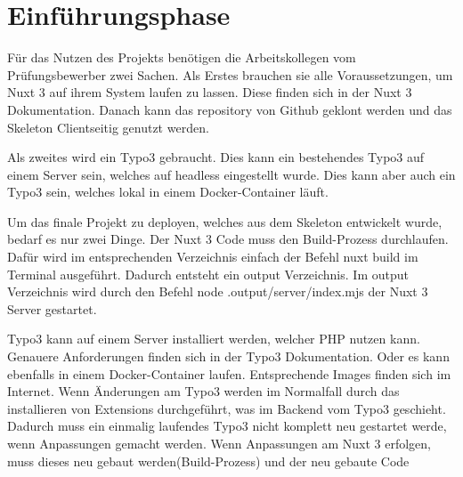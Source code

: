 \section{Einführungsphase}
\label{sec:Einfuehrungsphase}

Für das Nutzen des Projekts benötigen die Arbeitskollegen vom Prüfungsbewerber zwei Sachen. Als Erstes brauchen sie alle Voraussetzungen, um Nuxt 3 auf ihrem System laufen zu lassen. Diese finden sich in der Nuxt 3 Dokumentation. Danach kann das repository von Github geklont werden und das Skeleton Clientseitig genutzt werden.

Als zweites wird ein Typo3 gebraucht. Dies kann ein bestehendes Typo3 auf einem Server sein, welches auf headless eingestellt wurde. Dies kann aber auch ein Typo3 sein, welches lokal in einem Docker-Container läuft.

Um das finale Projekt zu deployen, welches aus dem Skeleton entwickelt wurde, bedarf es nur zwei Dinge. Der Nuxt 3 Code muss den Build-Prozess durchlaufen. Dafür wird im entsprechenden Verzeichnis einfach der Befehl nuxt build im Terminal ausgeführt. Dadurch entsteht ein output Verzeichnis. Im output Verzeichnis wird durch den Befehl node .output/server/index.mjs der Nuxt 3 Server gestartet. 

Typo3 kann auf einem Server installiert werden, welcher PHP nutzen kann. Genauere Anforderungen finden sich in der Typo3 Dokumentation. Oder es kann ebenfalls in einem Docker-Container laufen. Entsprechende Images finden sich im Internet. Wenn Änderungen am Typo3 werden im Normalfall durch das installieren von Extensions durchgeführt, was im Backend vom Typo3 geschieht. Dadurch muss ein einmalig laufendes Typo3 nicht komplett neu gestartet werde, wenn Anpassungen gemacht werden. Wenn Anpassungen am Nuxt 3 erfolgen, muss dieses neu gebaut werden(Build-Prozess) und der neu gebaute Code